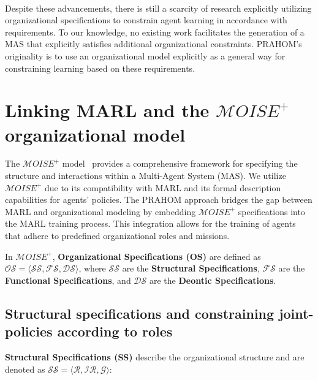 \documentclass[conference]{IEEEtran}
\begin{document}
\

Despite these advancements, there is still a scarcity of research explicitly utilizing organizational specifications to constrain agent learning in accordance with requirements. To our knowledge, no existing work facilitates the generation of a MAS that explicitly satisfies additional organizational constraints. PRAHOM's originality is to use an organizational model explicitly as a general way for constraining learning based on these requirements.

\section{Linking MARL and the $\mathcal{M}OISE^+$ organizational model}\label{sec:marl_moise_linking}

The $\mathcal{M}OISE^+$ model~\cite{Hubner2007} provides a comprehensive framework for specifying the structure and interactions within a Multi-Agent System (MAS). We utilize $\mathcal{M}OISE^+$ due to its compatibility with MARL and its formal description capabilities for agents' policies. The PRAHOM approach bridges the gap between MARL and organizational modeling by embedding $\mathcal{M}OISE^+$ specifications into the MARL training process. This integration allows for the training of agents that adhere to predefined organizational roles and missions.

In $\mathcal{M}OISE^+$, \textbf{Organizational Specifications (OS)} are defined as $\mathcal{OS} = \langle \mathcal{SS}, \mathcal{FS}, \mathcal{DS} \rangle$, where $\mathcal{SS}$ are the \textbf{Structural Specifications}, $\mathcal{FS}$ are the \textbf{Functional Specifications}, and $\mathcal{DS}$ are the \textbf{Deontic Specifications}.

\subsection{Structural specifications and constraining joint-policies according to roles}

\textbf{Structural Specifications (SS)} describe the organizational structure and are denoted as $\mathcal{SS} = \langle \mathcal{R}, \mathcal{IR}, \mathcal{G} \rangle$:
\end{document}
